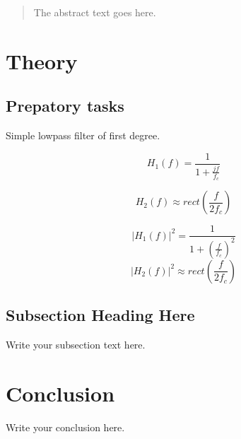 \documentclass{article}
\begin{document}
\author{Jens Edhammer & David Habrman}


\begin{abstract}
The abstract text goes here.
\end{abstract}

\newpage

\section{Theory}

\subsection{Prepatory tasks}
Simple lowpass filter of first degree.

\begin{equation}
    \label{simplefilter}
    H_1(f) = \frac{1}{1+\frac{jf}{f_c}}
\end{equation}

\begin{equation}
    \label{highorderfilter}
    H_2(f) \approx rect(\frac{f}{2f_c})
\end{equation}

\begin{equation}
    \label{absh1}
    |H_1(f)|^2 = \frac{1}{1+(\frac{f}{f_c})^2}
\end{equation}
\begin{equation}
    \label{absh2}
    |H_2(f)|^2 \approx rect(\frac{f}{2f_c})
\end{equation}






\subsection{Subsection Heading Here}
Write your subsection text here.


\section{Conclusion}
Write your conclusion here.
\end{document}
